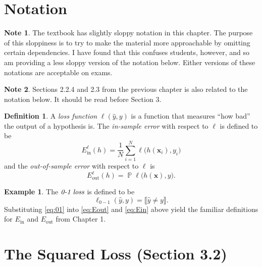 \documentclass[10pt]{exam}
\theoremstyle{definition}
\newtheorem{note}{Note}
\newtheorem{example}{Example}
\newtheorem{defn}{Definition}
\DeclareMathOperator{\prob}{\mathbb P}
\newcommand{\Ein}{E_{\text{in}}}
\newcommand{\Eout}{E_{\text{out}}}
\newcommand{\x}{\mathbf x}
\begin{document}
\section*{Notation}

\begin{note}
The textbook has slightly sloppy notation in this chapter.
The purpose of this sloppiness is to try to make the material more approachable by omitting certain dependencies.
I have found that this confuses students, however, and so am providing a less sloppy version of the notation below.
Either versions of these notations are acceptable on exams.
\end{note}

\begin{note}
Sections 2.2.4 and 2.3 from the previous chapter is also related to the notation below.
It should be read before Section 3.
\end{note}

\begin{defn}
    A \emph{loss function} $\ell(\hat y, y)$ is a function that measures ``how bad'' the output of a hypothesis is.
    The \emph{in-sample error} with respect to $\ell$ is defined to be
    \begin{equation}
        \label{eq:Ein}
        \Ein^{\ell}(h) = \frac{1}{N} \sum_{i=1}^N \ell\big(h(\x_i), y_i\big)
    \end{equation}
    and the \emph{out-of-sample error} with respect to $\ell$ is
    \begin{equation}
        \label{eq:Eout}
        \Eout^{\ell}(h) = \prob \ell\big(h(\x), y\big)
        .
    \end{equation}
\end{defn}

\begin{example}
    The $\emph{0-1 loss}$ is defined to be
    \begin{equation}
        \label{eq:01}
        \ell_{0-1}(\hat y, y) = \llbracket \hat y \ne y \rrbracket
        .
    \end{equation}
    Substituting \eqref{eq:01} into \eqref{eq:Eout} and \eqref{eq:Ein} above yield the familiar definitions for $\Ein$ and $\Eout$ from Chapter 1.
\end{example}

\newpage
\section*{The Squared Loss (Section 3.2)}
\end{document}
